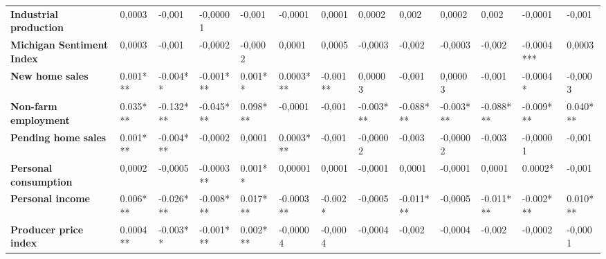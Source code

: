 \begin{landscape}
\begin{table}[]
{\begin{tabular}{@{}lllllllllllll@{}}
\textbf{Industrial production}    & 0,0003              & -0,001              & -0,00001            & -0,001              & -0,0001             & 0,0001              & 0,0002              & 0,002               & 0,0002              & 0,002               & -0,0001             & -0,001              \\
\textbf{Michigan Sentiment Index} & 0,0003              & -0,001              & -0,0002             & -0,0002             & 0,0001              & 0,0005              & -0,0003             & -0,002              & -0,0003             & -0,002              & -0.0004***          & 0,0003              \\
\textbf{New home sales}           & 0.001***            & -0.004**            & -0.001***           & 0.001**             & 0.0003***           & -0.001**            & 0,00003             & -0,001              & 0,00003             & -0,001              & -0.0004*            & -0,0003             \\
\textbf{Non-farm employment}      & 0.035***            & -0.132***           & -0.045***           & 0.098***            & -0,0001             & -0,001              & -0.003***           & -0.088***           & -0.003***           & -0.088***           & -0.009***           & 0.040***            \\
\textbf{Pending home sales}       & 0.001***            & -0.004***           & -0,0002             & 0,0001              & 0.0003***           & -0,001              & -0,00002            & -0,003              & -0,00002            & -0,003              & -0,00001            & -0,001              \\
\textbf{Personal consumption}     & 0,0002              & -0,0005             & -0.0003**           & 0.001**             & 0,00001             & 0,0001              & -0,0001             & 0,0001              & -0,0001             & 0,0001              & 0.0002*             & -0,001              \\
\textbf{Personal income}          & 0.006***            & -0.026***           & -0.008***           & 0.017***            & -0.0003**           & -0.002*             & -0,0005             & -0.011***           & -0,0005             & -0.011***           & -0.002***           & 0.010***            \\
\textbf{Producer price index}     & 0.0004**            & -0.003**            & -0.001***           & 0.002***            & -0,00004            & -0,0004             & -0,0004             & -0,002              & -0,0004             & -0,002              & -0,0002             & -0,0001             \\

\end{tabular}}
\end{table}
\end{landscape}
